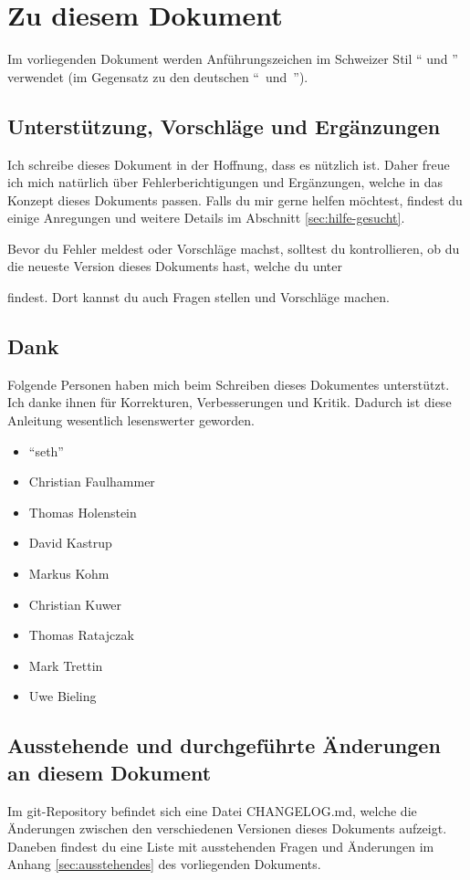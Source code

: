 \section{Zu diesem Dokument}

Im vorliegenden Dokument werden Anführungszeichen im Schweizer Stil \enquote{ und } verwendet (im Gegensatz zu den deutschen "`~und~"').

\subsection{Unterstützung, Vorschläge und Ergänzungen} %

Ich schreibe dieses Dokument in der Hoffnung, dass es nützlich ist. Daher freue ich mich natürlich über Fehlerberichtigungen und Ergänzungen, welche in das Konzept dieses Dokuments passen. Falls du mir gerne helfen möchtest, findest du einige Anregungen und weitere Details im Abschnitt \ref{sec:hilfe-gesucht}.

Bevor du Fehler meldest oder Vorschläge machst, solltest du kontrollieren, ob du die neueste Version dieses Dokuments hast, welche du unter


findest. Dort kannst du auch Fragen stellen und Vorschläge machen.

\subsection{Dank}

Folgende Personen haben mich beim Schreiben dieses Dokumentes unterstützt. Ich danke ihnen für Korrekturen, Verbesserungen und Kritik. Dadurch ist diese Anleitung wesentlich lesenswerter geworden. 

\begin{itemize}
	\item \enquote{seth}
	\item Christian Faulhammer
	\item Thomas Holenstein
	\item David Kastrup
	\item Markus Kohm
	\item Christian Kuwer
	\item Thomas Ratajczak
	\item Mark Trettin
	\item Uwe Bieling
\end{itemize}

\subsection{Ausstehende und durchgeführte Änderungen an diesem Dokument}

Im git-Repository befindet sich eine Datei CHANGELOG.md, welche die Änderungen zwischen den verschiedenen Versionen dieses Dokuments aufzeigt. Daneben findest du eine Liste mit ausstehenden Fragen und Änderungen im Anhang \ref{sec:ausstehendes} des vorliegenden Dokuments.

%
%
